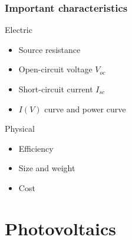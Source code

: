 \documentclass{beamer}
\begin{document}
\begin{frame}
  \frametitle{Important characteristics}
\begin{block}{Electric}
\begin{itemize}
  \item Source resistance
  \item Open-circuit voltage $V_{oc}$
  \item Short-circuit current $I_{sc}$
  \item $I(V)$ curve and power curve
\end{itemize}
\end{block}

\begin{block}{Physical}
\begin{itemize}
  \item Efficiency
  \item Size and weight
  \item Cost
\end{itemize}
\end{block}

\end{frame}

\section{Photovoltaics}
\end{document}
